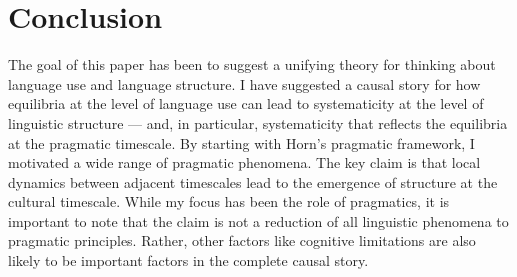 \documentclass[man, noapacite, 12pt]{apa2}
\begin{document}






\section{Conclusion} 
The goal of this paper has been to suggest a unifying theory for thinking about language use and language structure. I have suggested a causal story for how  equilibria at the level of language use can lead to systematicity at the level of linguistic structure --- and, in particular, systematicity that reflects the equilibria at the pragmatic timescale. By starting with Horn's pragmatic framework, I  motivated a wide range of pragmatic phenomena. The key claim is that local dynamics between adjacent timescales lead to the emergence of structure at the cultural timescale. While my focus has been the role of pragmatics, it is important to note that  the claim is not a reduction of all linguistic phenomena to pragmatic principles. Rather, other factors like cognitive limitations are also likely to be important factors in the complete causal story.
\end{document}
